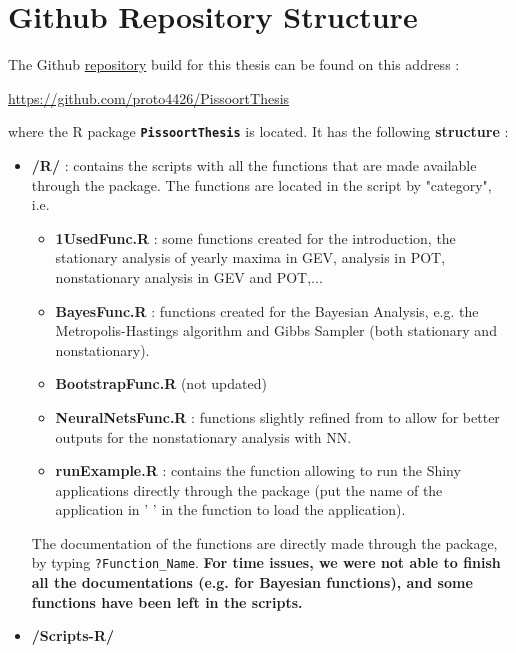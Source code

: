 \chapter{Github Repository Structure}\label{appgit}

The Github \href{https://github.com/proto4426/PissoortThesis/}{repository} build for this thesis can be found on this address :

\begin{center}
\url{https://github.com/proto4426/PissoortThesis}
\end{center}

where the R package \textbf{\texttt{PissoortThesis}} is located. It has the following \textbf{structure} : 

\begin{itemize}
\item \textbf{/R/} : contains the scripts with all the functions that are made available through the package. The functions are located in the script by "category", i.e. 
\begin{itemize}
\item \textbf{1UsedFunc.R} : some functions created for the introduction, the stationary analysis of yearly maxima in GEV, analysis in POT, nonstationary analysis in GEV and POT,...
\item \textbf{BayesFunc.R} : functions created for the Bayesian Analysis, e.g. the Metropolis-Hastings algorithm and Gibbs Sampler (both stationary and nonstationary).
\item \textbf{BootstrapFunc.R} (not updated)
\item \textbf{NeuralNetsFunc.R} : functions slightly refined from \citet{cannon_flexible_2010} to allow for better outputs for the nonstationary analysis with NN.
\item \textbf{runExample.R} : contains the function allowing to run the Shiny applications directly through the package (put the name of the application in ' ' in the function to load the application). 
\end{itemize} 

The documentation of the functions are directly made through the package, by typing \texttt{?Function\_Name}. 
\textbf{For time issues, we were not able to finish all the documentations (e.g. for Bayesian functions), and some functions have been left in the scripts.}
\item \textbf{/Scripts-R/}


\end{itemize}
